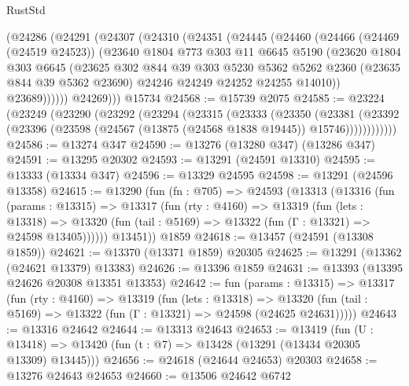 \begin{lexlean}{RustStd}
\begin{coremodule}
    (@24286
      (@24291
        (@24307
          (@24310
            (@24351
              (@24445
                (@24460
                  (@24466
                    (@24469 (@24519 @24523))
                    (@23640
                      @1804
                      @773
                      @303
                      @11
                      @6645
                      @5190
                      (@23620
                        @1804
                        @303
                        @6645
                        (@23625
                          @302
                          @844
                          @39
                          @303
                          @5230
                          @5362
                          @5262
                          @2360
                          (@23635 @844 @39 @5362 @23690)
                          @24246
                          @24249
                          @24252
                          @24255
                          @14010))
                      @23689))))))
          @24269)))
    @15734
@24568 := @15739 @2075
@24585 := @23224
    (@23249
      (@23290
        (@23292
          (@23294
            (@23315
              (@23333
                (@23350
                  (@23381
                    (@23392
                      (@23396 (@23598 (@24567 (@13875 (@24568 @1838 @19445)) @15746))))))))))))
@24586 := @13274 @347
@24590 := @13276 (@13280 @347) (@13286 @347)
@24591 := @13295 @20302
@24593 := @13291 (@24591 @13310)
@24595 := @13333 (@13334 @347)
@24596 := @13329 @24595
@24598 := @13291 (@24596 @13358)
@24615 := @13290
    (fun (fn : @705) =>
    @24593
      (@13313
        (@13316
          (fun (params : @13315) =>
          @13317
            (fun (rty : @4160) =>
            @13319
              (fun (lets : @13318) =>
              @13320 (fun (tail : @5169) => @13322 (fun (Γ : @13321) => @24598 @13405))))))
        @13451))
    @1859
@24618 := @13457 (@24591 (@13308 @1859))
@24621 := @13370 (@13371 @1859) @20305
@24625 := @13291 (@13362 (@24621 @13379) @13383)
@24626 := @13396 @1859
@24631 := @13393 (@13395 @24626 @20308 @13351 @13353)
@24642 := fun (params : @13315) =>
  @13317
    (fun (rty : @4160) =>
    @13319
      (fun (lets : @13318) =>
      @13320 (fun (tail : @5169) => @13322 (fun (Γ : @13321) => @24598 (@24625 @24631)))))
@24643 := @13316 @24642
@24644 := @13313 @24643
@24653 := @13419
    (fun (U : @13418) => @13420 (fun (t : @7) => @13428 (@13291 (@13434 @20305 @13309) @13445)))
@24656 := @24618 (@24644 @24653) @20303
@24658 := @13276 @24643 @24653
@24660 := @13506 @24642 @6742

\end{coremodule}
\end{lexlean}
